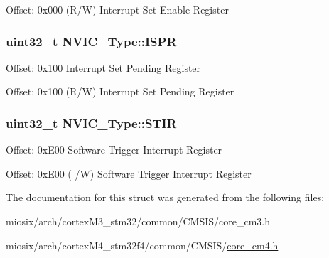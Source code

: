 Offset\-: 0x000 (R/\-W) Interrupt Set Enable Register \hypertarget{struct_n_v_i_c___type_ab7aef74794b43a7df880e19ed50b6257}{
\subsubsection[{I\-S\-P\-R}]{ uint32\-\_\-t N\-V\-I\-C\-\_\-\-Type\-::\-I\-S\-P\-R}}\label{struct_n_v_i_c___type_ab7aef74794b43a7df880e19ed50b6257}
Offset\-: 0x100 Interrupt Set Pending Register

Offset\-: 0x100 (R/\-W) Interrupt Set Pending Register \hypertarget{struct_n_v_i_c___type_a0b0d7f3131da89c659a2580249432749}{
\subsubsection[{S\-T\-I\-R}]{ uint32\-\_\-t N\-V\-I\-C\-\_\-\-Type\-::\-S\-T\-I\-R}}\label{struct_n_v_i_c___type_a0b0d7f3131da89c659a2580249432749}
Offset\-: 0x\-E00 Software Trigger Interrupt Register

Offset\-: 0x\-E00 ( /\-W) Software Trigger Interrupt Register 

The documentation for this struct was generated from the following files\-:\begin{DoxyCompactItemize}
\item 
miosix/arch/cortex\-M3\-\_\-stm32/common/\-C\-M\-S\-I\-S/core\-\_\-cm3.\-h\item 
miosix/arch/cortex\-M4\-\_\-stm32f4/common/\-C\-M\-S\-I\-S/\hyperlink{core__cm4_8h}{core\-\_\-cm4.\-h}\end{DoxyCompactItemize}
